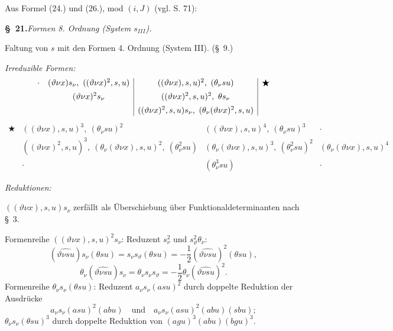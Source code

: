 Aus Formel (24.) und (26.), mod $(i,J)$ (vgl. S. 71):


\begin{center}
\textbf{\S\ 21.}\quad\emph{Formen 8. Ordnung (System $s_{III}$).}
\end{center}

Faltung von $s$ mit den Formen 4. Ordnung (System III). (\S\ 9.)

\noindent\emph{Irreduzible Formen:}
\[
\begin{array}{c@{\quad}c|c|c}
\cdot
& (\vartheta \nu x)s_\nu,\ ((\vartheta \nu x)^2,s,u)
& ((\vartheta \nu x),s,u)^2,\ (\theta_\nu su)
& \bigstar\\[0.45em]
& (\vartheta \nu x)^2s_\nu
& ((\vartheta \nu x)^2,s,u)^2,\ \theta s_\nu
& \\[0.45em]
&& ((\vartheta \nu x)^2,s,u)s_\nu,\ (\theta_\nu(\vartheta \nu x)^2,s,u)
&
\end{array}
\]
\[
\begin{array}{c|c|c|c}
\bigstar
& ((\vartheta \nu x),s,u)^3,\ (\theta_\nu su)^2
& ((\vartheta \nu x),s,u)^4,\ (\theta_\nu su)^3
& \cdot\\[0.45em]
& ((\vartheta \nu x)^2,s,u)^3,\ (\theta_\nu(\vartheta \nu x),s,u)^2,\ (\theta_\nu^2su)
& (\theta_\nu(\vartheta \nu x),s,u)^3,\ (\theta_\nu^2su)^2
& (\theta_\nu(\vartheta \nu x),s,u)^4\\[0.45em]
& \cdot
& (\theta_\nu^3su)
& \cdot
\end{array}
\]

\noindent\emph{Reduktionen:}

$((\vartheta \nu x),s,u)s_\nu$ zerfällt als Überschiebung über Funktionaldeterminanten nach \S\ 3.

Formenreihe $((\vartheta \nu x),s,u)^2s_\nu$: Reduzent $s_\nu^2$ und $s_\vartheta^2\theta_\nu$:
\[
(\widehat{\vartheta \nu su})s_\nu(\theta su)=s_\nu s_\vartheta(\theta su)=-\frac12(\widehat{\vartheta \nu su})^2(\theta su),
\]
\[
\theta_\nu(\widehat{\vartheta \nu su})s_\nu=\theta_\nu s_\nu s_\vartheta=-\frac12\theta_\nu(\widehat{\vartheta \nu su})^2.
\]
Formenreihe $\theta_\nu s_\nu(\theta su)$: Reduzent $a_\nu s_\nu(asu)^2$ durch doppelte Reduktion der Ausdrücke
\[
a_\nu s_\nu(asu)^2(abu)\quad\text{und}\quad a_\nu s_\nu(asu)^2(abu)(sbu);
\]
$\theta_\nu s_\nu(\theta su)^3$ durch doppelte Reduktion von $(agu)^3(abu)(bgu)^3$.

